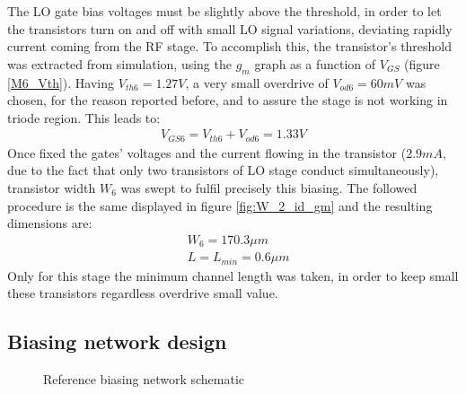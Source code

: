 The LO gate bias voltages must be slightly above the threshold, in order to let the transistors turn on and off with small LO signal variations, deviating rapidly current coming from the RF stage. To accomplish this, the transistor's threshold was extracted from simulation, using the \(g_{m}\) graph as a function of \(V_{GS}\) (figure \ref{M6_Vth}). 
Having \(V_{th6}=1.27V\), a very small overdrive of \( V_{od6}=60mV \) was chosen, for the reason reported before, and to assure the stage is not working in triode region. This leads to:
\begin{align}
	V_{GS6}=V_{th6}+V_{od6}=1.33V \nonumber
\end{align}
Once fixed the gates' voltages and the current flowing in the transistor (\(2.9mA\), due to the fact that only two transistors of LO stage conduct simultaneously), transistor width \(W_6\) was swept to fulfil precisely this biasing. The followed procedure is the same displayed in figure \ref{fig:W_2_id_gm} and the resulting dimensions are:
\begin{align}
	&W_6=170.3\mu m \nonumber\\
	&L = L_{min} = 0.6\mu m \nonumber
\end{align}                                                                      
Only for this stage the minimum channel length was taken, in order to keep small these transistors regardless overdrive small value.

\subsection{Biasing network design}

\begin{figure} [H]
	\centering
	\caption{Reference biasing network schematic}
	\label{fig:biasNet1}
\end{figure}

